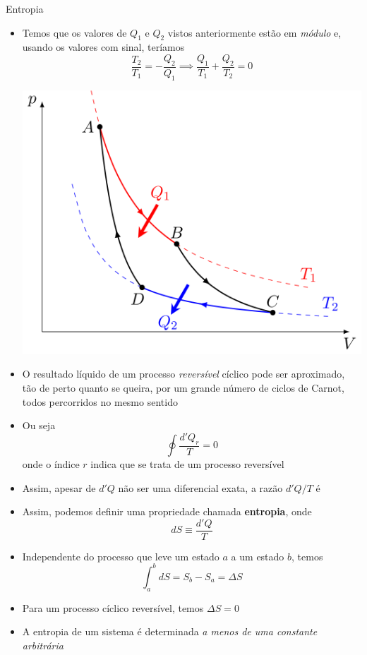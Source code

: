 \begin{frame}{Entropia}
    \begin{itemize}
        \item Temos que os valores de \(Q_1\) e \(Q_2\) vistos anteriormente estão em \textit{módulo}
            e, usando os valores com sinal, teríamos
            \[
                \frac{T_2}{T_1}=-\frac{Q_2}{Q_1} \implies \frac{Q_1}{T_1} + \frac{Q_2}{T_2}=0
            \]
            \begin{center}
                \includegraphics[height=\textheight-92pt-42pt]{images/Carnot-cycle-p-V-diagram.svg.png}
            \end{center}
        \item O resultado líquido de um processo \textit{reversível} cíclico pode ser 
            aproximado, tão de perto quanto se queira, por um grande número de ciclos de Carnot,
            todos percorridos no mesmo sentido
    \end{itemize}
\end{frame}

\begin{frame}
    \begin{itemize}
        \item Ou seja
            \[
                \oint {\frac{d'Q_r}{T}} = 0
            \]
            onde o índice \(r\) indica que se trata de um processo reversível
        \item Assim, apesar de \(d'Q\) não ser uma diferencial exata, a razão \(d'Q/T\) é
        \item Assim, podemos definir uma propriedade chamada \textbf{entropia}, onde
            \[
                dS \equiv \frac{d'Q}{T}
            \]
        \item Independente do processo que leve um estado \(a\) a um estado \(b\), temos 
            \[
                \int_{a}^{b} dS=S_b - S_a = \Delta S
            \]
        \item Para um processo cíclico reversível, temos \(\Delta S=0\)
        \item A entropia de um sistema é determinada \textit{a menos de uma constante arbitrária}

    \end{itemize}
\end{frame}

